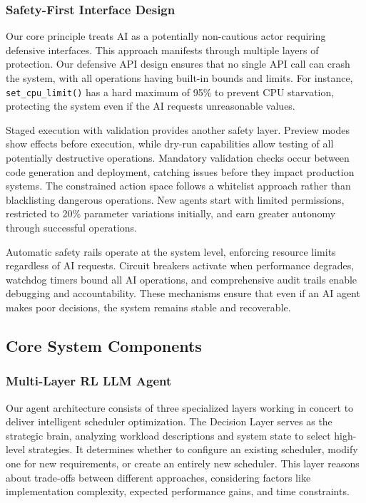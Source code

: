 \subsubsection{Safety-First Interface Design}
Our core principle treats AI as a potentially non-cautious actor requiring defensive interfaces. This approach manifests through multiple layers of protection. Our defensive API design ensures that no single API call can crash the system, with all operations having built-in bounds and limits. For instance, \texttt{set\_cpu\_limit()} has a hard maximum of 95\% to prevent CPU starvation, protecting the system even if the AI requests unreasonable values.

Staged execution with validation provides another safety layer. Preview modes show effects before execution, while dry-run capabilities allow testing of all potentially destructive operations. Mandatory validation checks occur between code generation and deployment, catching issues before they impact production systems. The constrained action space follows a whitelist approach rather than blacklisting dangerous operations. New agents start with limited permissions, restricted to 20\% parameter variations initially, and earn greater autonomy through successful operations.

Automatic safety rails operate at the system level, enforcing resource limits regardless of AI requests. Circuit breakers activate when performance degrades, watchdog timers bound all AI operations, and comprehensive audit trails enable debugging and accountability. These mechanisms ensure that even if an AI agent makes poor decisions, the system remains stable and recoverable.

\subsection{Core System Components}

\subsubsection{Multi-Layer RL LLM Agent}
Our agent architecture consists of three specialized layers working in concert to deliver intelligent scheduler optimization. The Decision Layer serves as the strategic brain, analyzing workload descriptions and system state to select high-level strategies. It determines whether to configure an existing scheduler, modify one for new requirements, or create an entirely new scheduler. This layer reasons about trade-offs between different approaches, considering factors like implementation complexity, expected performance gains, and time constraints.

